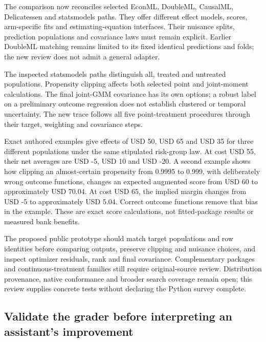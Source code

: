 The comparison now reconciles selected EconML, DoubleML, CausalML,
Delicatessen and statsmodels paths. They offer different effect models,
scores, arm-specific fits and estimating-equation interfaces. Their
nuisance splits, prediction populations and covariance laws must remain
explicit. Earlier DoubleML matching remains limited to its fixed
identical predictions and folds; the new review does not admit a general
adapter.
\citep{exec19_econml_source,runtime_doubleml_scope,exec14_causalml_primary,v13_sw_delicatessen,v131_sw_delicatessen}

The inspected statsmodels paths distinguish all, treated and untreated
populations. Propensity clipping affects both selected point and
joint-moment calculations. The final joint-GMM covariance has its own
options; a robust label on a preliminary outcome regression does not
establish clustered or temporal uncertainty. The new trace follows all
five point-treatment procedures through their target, weighting and
covariance steps. \citep{exec20_python_effect_source}

Exact authored examples give effects of USD 50, USD 65 and USD 35 for
three different populations under the same stipulated risk-group law. At
cost USD 55, their net averages are USD -5, USD 10 and USD -20. A second
example shows how clipping an almost-certain propensity from 0.9995 to
0.999, with deliberately wrong outcome functions, changes an expected
augmented score from USD 60 to approximately USD 70.04. At cost USD 65,
the implied margin changes from USD -5 to approximately USD 5.04.
Correct outcome functions remove that bias in the example. These are
exact score calculations, not fitted-package results or measured bank
benefits. \citep{exec20_python_effect_reference}

The proposed public prototype should match target populations and row
identities before comparing outputs, preserve clipping and nuisance
choices, and inspect optimizer residuals, rank and final covariance.
Complementary packages and continuous-treatment families still require
original-source review. Distribution provenance, native conformance and
broader search coverage remain open; this review supplies concrete tests
without declaring the Python survey complete.

\hypertarget{validate-the-grader-before-interpreting-an-assistants-improvement}{%
\subsection{Validate the grader before interpreting an assistant's
improvement}\label{validate-the-grader-before-interpreting-an-assistants-improvement}}

